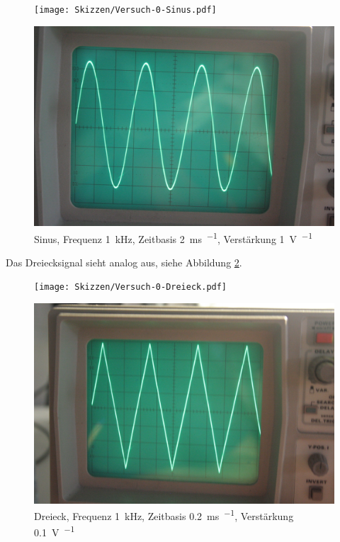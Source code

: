 \begin{figure}
	\centering
	\begin{minipage}{.45\linewidth}
		\texttt{[image: Skizzen/Versuch-0-Sinus.pdf]}
	\end{minipage}
	\hfill
	\begin{minipage}{.45\linewidth}
	\includegraphics[width=\linewidth]{Fotos/IMG_0745-1500.jpg}
	\end{minipage}
	\caption{%
		Sinus, Frequenz \SI{1}{\kilo\hertz}, Zeitbasis \SI{2}{\milli\second\per\division}, Verstärkung \SI{1}{\volt\per\division}
	}
	\label{fig:0745}
\end{figure}

Das Dreiecksignal sieht analog aus, siehe Abbildung \ref{fig:0746}.

\begin{figure}
	\centering
	\begin{minipage}{.45\linewidth}
		\texttt{[image: Skizzen/Versuch-0-Dreieck.pdf]}
	\end{minipage}
	\hfill
	\begin{minipage}{.45\linewidth}
	\includegraphics[width=\linewidth]{Fotos/IMG_0746-1500.jpg}
	\end{minipage}
	\caption{%
		Dreieck, Frequenz \SI{1}{\kilo\hertz}, Zeitbasis \SI{.2}{\milli\second\per\division}, Verstärkung \SI{.1}{\volt\per\division}
	}
	\label{fig:0746}
\end{figure}

